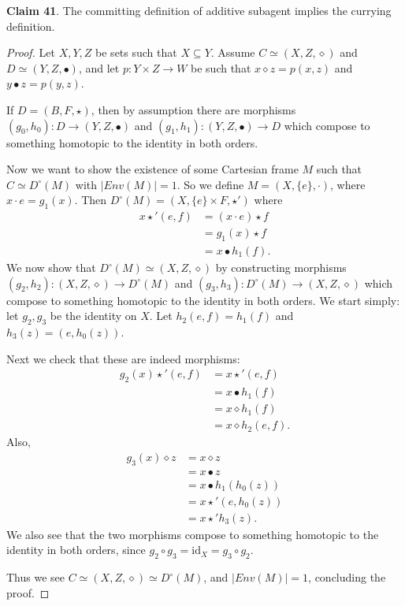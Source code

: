 \documentclass{article}
\begin{document}
\bigskip
\noindent \textbf{Claim 41}.
The committing definition of additive subagent implies the currying definition.
\begin{proof}
Let $X, Y, Z$ be sets such that $X \subseteq Y$.
Assume $C \simeq (X, Z, \diamond)$ and $D \simeq (Y, Z, \bullet)$,  and let $p: Y \times Z \to W$ be such that $x \diamond z = p(x, z)$ and $y \bullet z = p(y, z)$.

If $D = (B, F, \star)$, then by assumption there are morphisms $(g_0, h_0): D \to (Y, Z, \bullet)$ and $(g_1, h_1) : (Y, Z, \bullet) \to D$ which compose to something homotopic to the identity in both orders.

Now we want to show the existence of some Cartesian frame $M$ such that $C \simeq D^{\circ}(M)$ with $|Env(M)| = 1$.
So we define $M = (X, \{e\}, \cdot)$, where $x \cdot e = g_1(x)$.
Then $D^{\circ}(M) = (X, \{e\} \times F, \star')$ where
\[
\begin{split}
    x \star' (e, f) & = (x \cdot e) \star f \\
                    & = g_1(x) \star f \\
                    & = x  \bullet h_1(f).
\end{split}
\]
We now show that $D^{\circ}(M) \simeq (X, Z, \diamond)$ by constructing morphisms $(g_2, h_2):(X, Z, \diamond) \to D^{\circ}(M)$ and $(g_3, h_3):D^{\circ}(M) \to (X, Z, \diamond)$ which compose to something homotopic to the identity in both orders.
We start simply: let $g_2, g_3$ be the identity on $X$.
Let $h_2(e, f) = h_1(f)$ and $h_3(z) = (e, h_0(z))$.

Next we check that these are indeed morphisms:
\[
\begin{split}
    g_2(x) \star' (e, f) & = x \star' (e, f) \\
                         & = x \bullet h_1(f) \\
                         & = x \diamond h_1(f) \\
                         & = x \diamond h_2(e, f).
\end{split}
\]
Also,
\[
\begin{split}
    g_3(x) \diamond z & = x \diamond z \\
                      & = x \bullet z \\
                      & = x \bullet h_1(h_0(z)) \\
                      & = x \star' (e, h_0(z)) \\
                      & = x \star' h_3(z).
\end{split}
\]
We also see that the two morphisms compose to something homotopic to the identity in both orders, since $g_2 \circ g_3 = \text{id}_X = g_3 \circ g_2$.

Thus we see $C \simeq (X, Z, \diamond) \simeq D^{\circ}(M)$, and $|Env(M)| = 1$, concluding the proof.
\end{proof}
\end{document}
